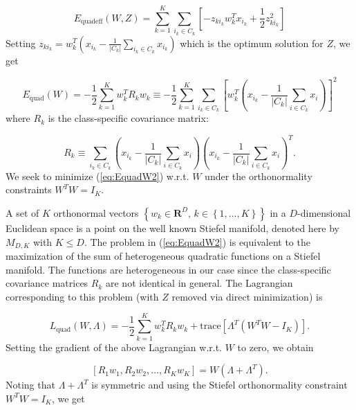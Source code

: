 \begin{equation}
E_{\mathrm{quadeff}}(W,Z)=\sum_{k=1}^{K}\sum_{i_{k}\in C_{k}}\left[-z_{ki_{k}}w_{k}^{T}x_{i_{k}}+\frac{1}{2}z_{ki_{k}}^{2}\right]\label{eq:Equadeff2}
\end{equation}
Setting $z_{ki_{k}}=w_{k}^{T}\left(x_{i_{k}}-\frac{1}{|C_{k}|}\sum_{i_{k}\in C_{k}}x_{i_{k}}\right)$
which is the optimum solution for $Z$, we get

\begin{equation}
E_{\mathrm{quad}}(W)=-\frac{1}{2}\sum_{k=1}^{K}w_{k}^{T}R_{k}w_{k}\equiv-\frac{1}{2}\sum_{k=1}^{K}\sum_{i_{k}\in C_{k}}\left[w_{k}^{T}\left(x_{i_{k}}-\frac{1}{|C_{k}|}\sum_{i\in C_{k}}x_{i}\right)\right]^{2}\label{eq:EquadW2}
\end{equation}
where $R_{k}$ is the class-specific covariance matrix:

\begin{equation}
R_{k}\equiv\sum_{i_{k}\in C_{k}}\left(x_{i_{k}}-\frac{1}{|C_{k}|}\sum_{i\in C_{k}}x_{i}\right)\left(x_{i_{k}}-\frac{1}{|C_{k}|}\sum_{i\in C_{k}}x_{i}\right)^{T}.\label{eq:Rkdef}
\end{equation}
We seek to minimize (\ref{eq:EquadW2}) w.r.t. $W$ under the orthonormality
constraints $W^{T}W=I_{K}$. 

A set of $K$ orthonormal vectors $\left\{ w_{k}\in\mathbf{R}^{D},\,k\in\left\{ 1,\ldots,K\right\} \right\} $
in a $D$-dimensional Euclidean space is a point on the well known
Stiefel manifold, denoted here by $M_{D,K}$ with $K\leq D$. The
problem in (\ref{eq:EquadW2}) is equivalent to the maximization of
the sum of heterogeneous quadratic functions on a Stiefel manifold.
The functions are heterogeneous in our case since the class-specific
covariance matrices $R_{k}$ are not identical in general. The Lagrangian
corresponding to this problem (with $Z$ removed via direct minimization)
is

\begin{equation}
L_{\mathrm{quad}}(W,\Lambda)=-\frac{1}{2}\sum_{k=1}^{K}w_{k}^{T}R_{k}w_{k}+\mathrm{trace}\left[\Lambda^{T}\left(W^{T}W-I_{K}\right)\right].\label{eq:Lagrangian_quad}
\end{equation}
Setting the gradient of the above Lagrangian w.r.t. $W$ to zero,
we obtain 

\begin{equation}
\left[R_{1}w_{1},R_{2}w_{2},\ldots,R_{K}w_{K}\right]=W(\Lambda+\Lambda^{T}).\label{eq:RW=00003DSWW1}
\end{equation}
Noting that $\Lambda+\Lambda^{T}$ is symmetric and using the Stiefel
orthonormality constraint $W^{T}W=I_{K}$, we get 

